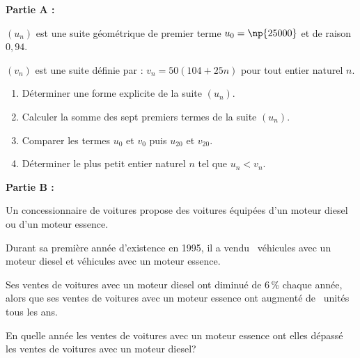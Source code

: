 \bigskip

\textbf{Partie A :}

\medskip

$\left(u_n\right)$ est une suite géométrique de premier terme $u_0 = \np{25000}$ et de raison $0,94$.

$\left(v_n\right)$ est une suite définie par : $v_n = 50(104 + 25n)$ pour tout entier naturel $n$.

\medskip

\begin{enumerate}
\item Déterminer une forme explicite de la suite $\left(u_n\right)$.
\item Calculer la somme des sept premiers termes de la suite $\left(u_n\right)$. 
\item Comparer les termes $u_0$ et $v_0$ puis $u_{20}$ et $v_{20}$.
\item Déterminer le plus petit entier naturel $n$ tel que $u_n < v_n$.
\end{enumerate}

\bigskip

\textbf{Partie B :}

\medskip

Un concessionnaire de voitures propose des voitures équipées d'un moteur diesel ou d'un moteur essence.

Durant sa première année d'existence en 1995, il a vendu ~véhicules avec un moteur diesel et  véhicules avec un moteur essence.

Ses ventes de voitures avec un moteur diesel ont diminué de 6\,\% chaque année, alors que ses ventes de voitures avec un moteur essence ont augmenté de ~unités tous les ans.

En quelle année les ventes de voitures avec un moteur essence ont elles dépassé les ventes de voitures avec un moteur diesel?


\bigskip
